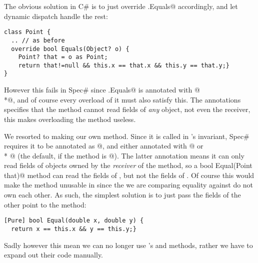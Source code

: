 The obvious solution in C\# is to just override \Q@Object.Equals@ accordingly, and let dynamic dispatch handle the rest:
\begin{lstlisting}
class Point {
  .. // as before
  override bool Equals(Object? o) {
    Point? that = o as Point;
    return that!=null && this.x == that.x && this.y == that.y;}
}
\end{lstlisting}

However this fails in Spec\# since \Q@Object.Equals@ is annotated with \Q@[Pure]@\\*@, and of course every overload of it must also satisfy this. The \Q@Reads@ annotations specifies that the method cannot read fields of \emph{any} object, not even the receiver, this makes overloading the method useless.

We resorted to making our own \Q@Equal@ method. Since it is called in \Q@Cage@'s invariant, Spec\# requires it to be annotated as \Q@[Pure]@, and either annotated with @ or \\* @ (the default, if the method is \Q@[Pure]@). The latter annotation means it can only read fields of objects owned by the \emph{receiver} of the method, so a \Q@[Pure] bool Equal(Point that)@ method can read the fields of \Q@this@, but not the fields of \Q@that@. Of course this would make the method unusable in \Q@Cage@ since the \Q@Point@s we are comparing equality against do not own each other. As such, the simplest solution is to just pass the fields of the other point to the method:
\begin{lstlisting}
[Pure] bool Equal(double x, double y) {
  return x == this.x && y == this.y;}
\end{lstlisting}

Sadly however this mean we can no longer use \Q@List@'s \Q@Contains@ and \Q@IndexOf@ methods, rather we have to expand out their code manually.
\lstset{language=FortyTwo}
